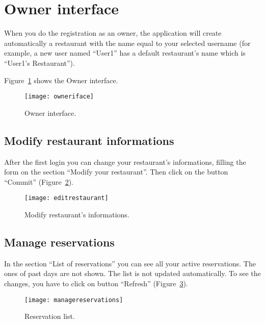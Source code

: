 \section{Owner interface}

When you do the registration as an owner, the application will create
automatically a restaurant with the name equal to your selected username (for
example, a new user named ``User1'' has a default restaurant’s name which is
``User1’s Restaurant'').

Figure~\ref{fig:owneriface} shows the Owner interface.

\begin{figure}[!ht]
	\texttt{[image: owneriface]}
	\caption{Owner interface.}
	\label{fig:owneriface}
\end{figure}

\subsection{Modify restaurant informations}

After the first login you can change your restaurant’s informations, filling the
form on the section ``Modify your restaurant''. Then click on the button
``Commit'' (Figure~\ref{fig:editrestaurant}).

\begin{figure}[!ht]
	\texttt{[image: editrestaurant]}
	\caption{Modify restaurant's informations.}
	\label{fig:editrestaurant}
\end{figure}

\subsection{Manage reservations}

In the section ``List of reservations'' you can see all your active
reservations.  The ones of past days are not shown. The list is not updated
automatically. To see the changes, you have to click on button ``Refresh''
(Figure~\ref{fig:managereservations}).

\begin{figure}[!ht]
	\texttt{[image: managereservations]}
	\caption{Reservation list.}
	\label{fig:managereservations}
\end{figure}
